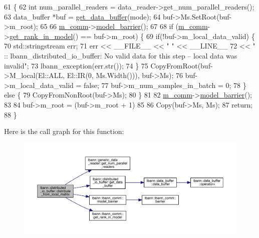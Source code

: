 \begin{DoxyCode}
61                                                                                                            
                              \{
62   \textcolor{keywordtype}{int} num\_parallel\_readers = data\_reader->get\_num\_parallel\_readers();
63   data\_buffer *buf = \hyperlink{classlbann_1_1distributed__io__buffer_ac176f3fced1191534a985f831136aa3e}{get\_data\_buffer}(mode);
64   buf->Ms.SetRoot(buf->m\_root);
65 
66   \hyperlink{classlbann_1_1generic__io__buffer_a2e4a46c85c8b30e10b1cc5acaa2c4cca}{m\_comm}->\hyperlink{classlbann_1_1lbann__comm_a6086ced12c3eefeea6e2a78eff286983}{model\_barrier}();
67 
68   \textcolor{keywordflow}{if} (\hyperlink{classlbann_1_1generic__io__buffer_a2e4a46c85c8b30e10b1cc5acaa2c4cca}{m\_comm}->\hyperlink{classlbann_1_1lbann__comm_a789453454468a3b70de768537c50ca52}{get\_rank\_in\_model}() == buf->m\_root) \{
69     \textcolor{keywordflow}{if}(!buf->m\_local\_data\_valid) \{
70       std::stringstream err;
71       err << \_\_FILE\_\_ << \textcolor{stringliteral}{" "} << \_\_LINE\_\_
72           << \textcolor{stringliteral}{" :: lbann\_distributed\_io\_buffer: No valid data for this step -- local data was invalid"};
73       lbann\_exception(err.str());
74     \}
75     CopyFromRoot(buf->M\_local(El::ALL, El::IR(0, Ms.Width())), buf->Ms);
76     buf->m\_local\_data\_valid = \textcolor{keyword}{false};
77     buf->m\_num\_samples\_in\_batch = 0;
78   \} \textcolor{keywordflow}{else} \{
79     CopyFromNonRoot(buf->Ms);
80   \}
81 
82   \hyperlink{classlbann_1_1generic__io__buffer_a2e4a46c85c8b30e10b1cc5acaa2c4cca}{m\_comm}->\hyperlink{classlbann_1_1lbann__comm_a6086ced12c3eefeea6e2a78eff286983}{model\_barrier}();
83 
84   buf->m\_root = (buf->m\_root + 1) %
85 
86   Copy(buf->Ms, Ms);
87   \textcolor{keywordflow}{return};
88 \}
\end{DoxyCode}
Here is the call graph for this function\+:\nopagebreak
\begin{figure}[H]
\begin{center}
\leavevmode
\includegraphics[width=350pt]{classlbann_1_1distributed__io__buffer_a3a770ec2314313761d6f0eccdb9dc09b_cgraph}
\end{center}
\end{figure}
